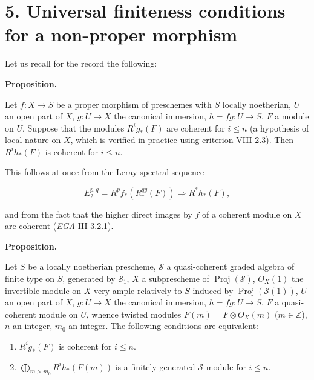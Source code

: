 \documentclass[
  11pt,
  a4paper,
]{book}
\providecommand{\tightlist}{%
  \setlength{\itemsep}{0pt}\setlength{\parskip}{0pt}}
\begin{document}
\section{5. Universal finiteness conditions for a non-proper
morphism}\label{universal-finiteness-conditions-for-a-non-proper-morphism}

Let us recall for the record the following:

\textbf{Proposition.}

Let \(f: X \to S\) be a proper morphism of preschemes with \(S\) locally
noetherian, \(U\) an open part of \(X\), \(g: U \to X\) the canonical
immersion, \(h = fg: U \to S\), \(F\) a module on \(U\). Suppose that
the modules \(R^{i}g_{\ast}(F)\) are coherent for \(i \leqslant n\) (a
hypothesis of local nature on \(X\), which is verified in practice using
criterion VIII 2.3). Then \(R^{i}h_{\ast}(F)\) is coherent for
\(i \leqslant n\).

This follows at once from the Leray spectral sequence

\[ E^{p,q}_{2} = R^{p}f_{\ast}(R^{qg}_{\ast}(F)) \Rightarrow R^{\ast }h_{\ast}(F), \]

and from the fact that the higher direct images by \(f\) of a coherent
module on \(X\) are coherent
(\href{https://jcreinhold.github.io/ega/iii/10-ch3-03-finiteness-proper-morphisms.html\#32-the-finiteness-theorem-case-of-usual-schemes}{\emph{EGA}
III 3.2.1}).

\textbf{Proposition.}

Let \(S\) be a locally noetherian prescheme, \(\mathcal{S}\) a
quasi-coherent graded algebra of finite type on \(S\), generated by
\(\mathcal{S}_{1}\), \(X\) a subprescheme of
\(\operatorname{Proj}(\mathcal{S})\), \(O_{X}(1)\) the invertible module
on \(X\) very ample relatively to \(S\) induced by
\(\operatorname{Proj}(\mathcal{S}(1))\), \(U\) an open part of \(X\),
\(g: U \to X\) the canonical immersion, \(h = fg: U \to S\), \(F\) a
quasi-coherent module on \(U\), whence twisted modules
\(F(m) = F \otimes O_{X}(m)\) (\(m \in \mathbb{Z}\)), \(n\) an integer,
\(m_{0}\) an integer. The following conditions are equivalent:

\begin{enumerate}
\def\labelenumi{\arabic{enumi}.}
\tightlist
\item
  \(R^{i}g_{\ast}(F)\) is coherent for \(i \leqslant n\).
\item
  \(\bigoplus_{m>m_{0}} R^{i}h_{\ast}(F(m))\) is a finitely generated
  \(\mathcal{S}\)-module for \(i \leqslant n\).
\end{enumerate}
\end{document}
